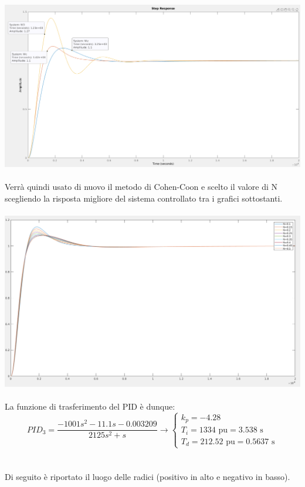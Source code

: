 \documentclass[Lau,noexaminfo]{sapthesis}
\begin{document}
	\includegraphics[scale=0.32,angle=90]{tuning_migliore_P3}\\\\
	Verrà quindi usato di nuovo il metodo di Cohen-Coon e scelto il valore di N scegliendo la risposta migliore del sistema controllato tra i grafici sottostanti.\\\\
	\includegraphics[scale=0.32,angle=-90]{vari_n_P3}\\\\
	La funzione di trasferimento del PID è dunque:\\
	\begin{equation}
	PID_3=\frac{-1001s^2-11.1s-0.003209}{2125s^2+s}\rightarrow\begin{cases}
	k_p=-4.28\\
	T_i=1334 \text{ pu} = 3.538\text{ s}\\
	T_d=212.52 \text{ pu} = 0.5637\text{ s}
	\end{cases}
	\end{equation}\\\\
	Di seguito è riportato il luogo delle radici (positivo in alto e negativo in basso).\\
\end{document}
